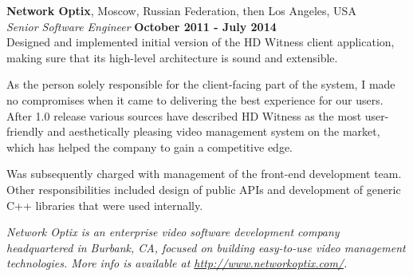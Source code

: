 \documentclass[margin,line]{CV}
\begin{document}
\begin{resume}
\ifdefined\superofficial
    \pagebreak
\fi
\ifdefined\superofficial\else
    \pagebreak    
\fi
    
    \textbf{Network Optix}, Moscow, Russian Federation, then Los Angeles, USA \vspace{2mm}\\\vspace{1mm}%
    \textsl{Senior Software Engineer} \hfill \textbf{October 2011 - July 2014}\\ 
    Designed and implemented initial version of the HD Witness client application, making sure that its high-level architecture is sound and extensible.

    As the person solely responsible for the client-facing part of the system, I made no compromises when it came to delivering the best experience for our users. After 1.0 release various sources have described HD Witness as the most user-friendly and aesthetically pleasing video management system on the market, which has helped the company to gain a competitive edge.

    Was subsequently charged with management of the front-end development team. Other responsibilities included design of public APIs and development of generic C++ libraries that were used internally.
    
    

\ifdefined\superofficial
    {\footnotesize\textit{Network Optix is an enterprise video software development company headquartered in Burbank, CA, focused on building easy-to-use video management technologies. More info is available at \url{http://www.networkoptix.com/}.}}
\fi
    


\end{resume}
\end{document}
